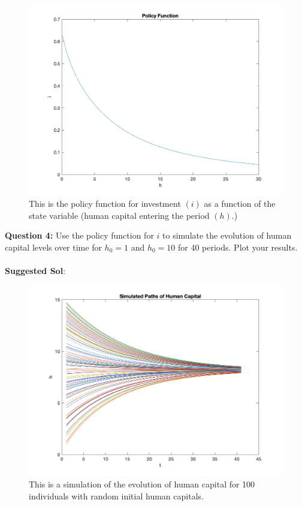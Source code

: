 \documentclass[11pt]{article}
\begin{document}
\begin{figure}[ht!]
\centering
\includegraphics[scale=0.5]{Fig1.png}
\caption{This is the policy function for investment $(i)$ as a function of the state variable (human capital entering the period $(h)$.)}
\end{figure}

\clearpage
\textbf{Question 4:} Use the policy function for $i$ to simulate the evolution of human capital levels over time for $h_0=1$ and $h_0=10$ for 40 periods.  Plot your results.\\
\ \\
\textbf{Suggested Sol}: \\
\begin{figure}[ht!]
\centering
\includegraphics[scale=0.5]{Fig2.png}
\caption{This is a simulation of the evolution of human capital for 100 individuals with random initial human capitals.}
\end{figure}
\end{document}
